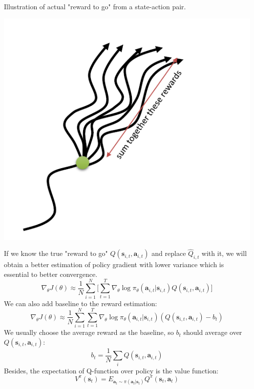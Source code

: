 \documentclass{tufte-handout}
\newcommand{\s}{\mathbf{s}}
\newcommand{\act}{\mathbf{a}}
\begin{document}
\begin{marginfigure}
\caption{Illustration of actual "reward to go" from a state-action pair.}
\includegraphics[width=\linewidth]{reward-to-go}
\label{fig:reward-to-go}
\end{marginfigure}
If we know the true "reward to go" $Q(\s_{i,t}, \act_{i,t})$ and replace $\hat{Q}_{i,t}$ with it, we will obtain a better estimation of policy gradient with lower variance which is essential to better convergence.
\begin{equation}
\label{eq:3}
\nabla _\theta J(\theta)  \approx \frac{1}{N} \sum_{i=1} ^ {N} \bigg[\sum_{t=1}^T \nabla_\theta \log \pi_\theta(\act_{i,t}| \s_{i,t})
  Q(\s_{i,t}, \act_{i,t}) \bigg]
\end{equation}
We can also add baseline to the reward estimation:
\begin{equation}
\label{eq:4}
\nabla _\theta J(\theta)  \approx \frac{1}{N} \sum_{i=1} ^ {N} \sum_{t=1}^T \nabla_\theta \log \pi_\theta(\act_{i,t}| \s_{i,t})
  (Q(\s_{i,t}, \act_{i,t}) - b_t)
\end{equation}
We usually choose the average reward as the baseline, so $b_t$ should average over $Q(\s_{i,t}, \act_{i,t})$:
\begin{equation}
\label{eq:5}
b_t = \frac{1}{N} \sum_i Q(\s_{i,t}, \act_{i,t})
\end{equation}
Besides, the expectation of Q-function over policy is the value function:
\begin{equation}
\label{eq:6}
V^\pi (\s_t) = E_{\act_t \sim \pi(\act_t | \s_t)} Q^\pi (\s_t, \act_t)
\end{equation}
\end{document}
